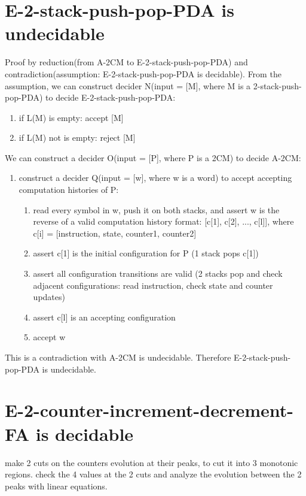 \documentclass{article}
\begin{document}
\section{E-2-stack-push-pop-PDA is undecidable}
Proof by reduction(from A-2CM to E-2-stack-push-pop-PDA) and contradiction(assumption: E-2-stack-push-pop-PDA is decidable). From the assumption, we can construct decider N(input = [M], where M is a 2-stack-push-pop-PDA) to decide E-2-stack-push-pop-PDA:
\begin{enumerate}
	\item if L(M) is empty: accept [M]
	\item if L(M) not is empty: reject [M]
\end{enumerate}
We can construct a decider O(input = [P], where P is a 2CM) to decide A-2CM:
\begin{enumerate}
	\item construct a decider Q(input = [w], where w is a word) to accept accepting computation histories of P:
	\begin{enumerate}
		\item read every symbol in w, push it on both stacks, and assert w is the reverse of a valid computation history format: [c[1], c[2], ..., c[l]], where c[i] = [instruction, state, counter1, counter2]
		\item assert c[1] is the initial configuration for P (1 stack pops c[1])
		\item assert all configuration transitions are valid (2 stacks pop and check adjacent configurations: read instruction, check state and counter updates)
		\item assert c[l] is an accepting configuration
		\item accept w
	\end{enumerate}
\end{enumerate}
This is a contradiction with A-2CM is undecidable. Therefore E-2-stack-push-pop-PDA is undecidable.

\section{E-2-counter-increment-decrement-FA is decidable}
make 2 cuts on the counters evolution at their peaks, to cut it into 3 monotonic regions. check the 4 values at the 2 cuts and analyze the evolution between the 2 peaks with linear equations.
\end{document}
